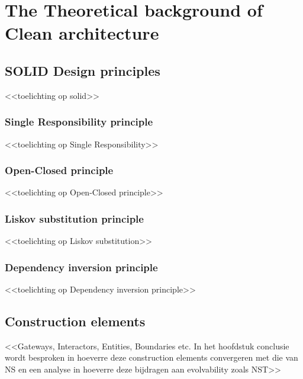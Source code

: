 \section{The Theoretical background of Clean architecture}\label{sec:ca_theory}

\subsection{SOLID Design principles} \label{subsec:solid}
<<toelichting op solid>>

\subsubsection{Single Responsibility principle}
<<toelichting op Single Responsibility>>

\subsubsection{Open-Closed principle}
<<toelichting op Open-Closed principle>>

\subsubsection{Liskov substitution principle}
<<toelichting op Liskov substitution>>

\subsubsection{Dependency inversion principle}
<<toelichting op Dependency inversion principle>>

\subsection{Construction elements}
<<Gateways, Interactors, Entities, Boundaries etc. In het hoofdstuk conclusie wordt
besproken in hoeverre deze construction elements convergeren met die van NS en een
analyse in hoeverre deze bijdragen aan evolvability zoals NST>>